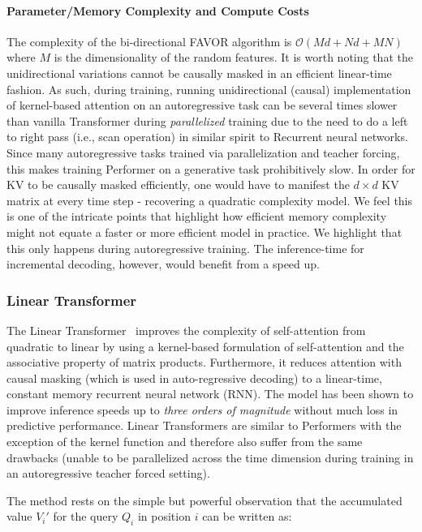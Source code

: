 \paragraph{Parameter/Memory Complexity and Compute Costs} The complexity of the bi-directional FAVOR algorithm is $\mathcal{O}(Md + N d + MN)$ where $M$ is the dimensionality of the random features. It is worth noting that the unidirectional variations cannot be causally masked in an efficient linear-time fashion. As such, during training, running unidirectional (causal) implementation of kernel-based attention on an autoregressive task can be several times slower than vanilla Transformer during \textit{parallelized} training due to the need to do a left to right pass (i.e., scan operation) in similar spirit to Recurrent neural networks. Since many autoregressive tasks trained via parallelization and teacher forcing, this makes training Performer on a generative task prohibitively slow. In order for KV to be causally masked efficiently, one would have to manifest the $d \times d$ KV matrix at every time step - recovering a quadratic complexity model. We feel this is one of the intricate points that highlight how efficient memory complexity might not equate a faster or more efficient model in practice. We highlight that this only happens during autoregressive training. The inference-time for incremental decoding, however, would benefit from a speed up.

\subsubsection{Linear Transformer} The Linear Transformer~\citep{katharopoulos2020transformers} improves the complexity of self-attention from quadratic to linear by using a kernel-based formulation of self-attention and the associative property of matrix products. Furthermore, it reduces attention with causal masking (which is used in auto-regressive decoding) to a linear-time, constant memory recurrent neural network (RNN). The model has been shown to improve inference speeds up to \emph{three orders of magnitude} without much loss in predictive performance. Linear Transformers are similar to Performers with the exception of the kernel function and therefore also suffer from the same drawbacks (unable to be parallelized across the time dimension during training in an autoregressive teacher forced setting). 

The method rests on the simple but powerful observation that the accumulated value $V_i'$ for the query $Q_i$ in position $i$ can be written as:

